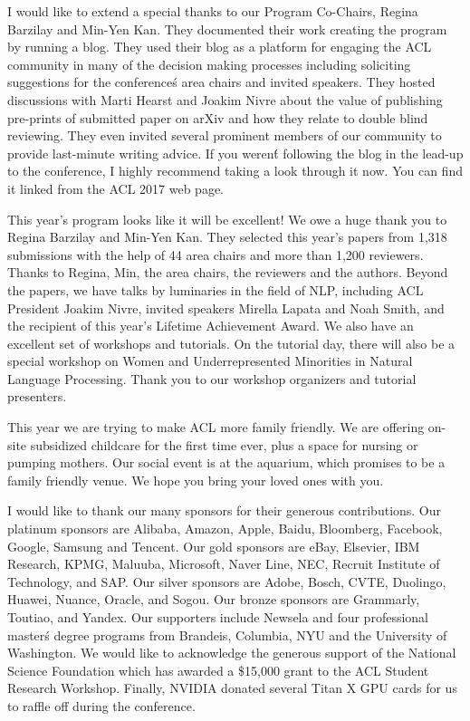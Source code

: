 I would like to extend a special thanks to our Program Co-Chairs, Regina Barzilay and Min-Yen Kan.  They documented their work creating the program by running a blog.  They used their blog as a platform for engaging the ACL community in many of the decision making processes including soliciting suggestions for the conference\'s area chairs and invited speakers. They hosted discussions with Marti Hearst and Joakim Nivre about the value of publishing pre-prints of submitted paper on arXiv and how they relate to double blind reviewing.  They even invited several prominent members of our community to provide last-minute writing advice.  If you weren\'t following the blog in the lead-up to the conference, I highly recommend taking a look through it now.  You can find it linked from the ACL 2017 web page.


This year's program looks like it will be excellent!  We owe a huge thank you
to Regina Barzilay and Min-Yen Kan.  They selected this
year's papers from 1,318 submissions with the help of 44 area chairs and more
than 1,200 reviewers. Thanks to Regina, Min, the area chairs, the reviewers
and the authors. Beyond the papers, we have talks by luminaries in the field
of NLP, including ACL President Joakim Nivre, invited speakers Mirella 
Lapata and Noah Smith, and the recipient of this year's Lifetime Achievement
Award.  We also have an excellent set of workshops and tutorials. 
On the tutorial day, there will also be a special workshop on Women and Underrepresented Minorities in Natural Language Processing.    Thank you to
our workshop organizers and tutorial presenters.

This year we are trying to make ACL more family friendly. We are offering
on-site subsidized childcare for the first time ever, plus a space for nursing
or pumping mothers. Our social event is at the aquarium, which promises to be
a family friendly venue. We hope you bring your loved ones with you.


I would like to thank our many sponsors for their generous contributions.  
Our platinum sponsors are 
Alibaba, 
Amazon, 
Apple, 
Baidu, 
Bloomberg, 
Facebook, 
Google, 
Samsung and 
Tencent.  
Our gold sponsors are 
eBay, 
Elsevier, 
IBM Research, 
KPMG, 
Maluuba, 
Microsoft, 
Naver Line, 
NEC,
Recruit Institute of Technology, and 
SAP.  
Our silver sponsors are 
Adobe,
Bosch,
CVTE,
Duolingo,
Huawei,
Nuance,
Oracle, and
Sogou.
Our bronze sponsors are 
Grammarly, 
Toutiao, and 
Yandex.  
Our supporters include 
Newsela 
and four professional master\'s degree programs from 
Brandeis, 
Columbia, 
NYU and 
the University of Washington.  
We would like to acknowledge the generous support of the National Science Foundation which has awarded a \$15,000 grant to the ACL Student Research Workshop.
Finally, NVIDIA donated several Titan X GPU cards for us to raffle off during the conference. 

